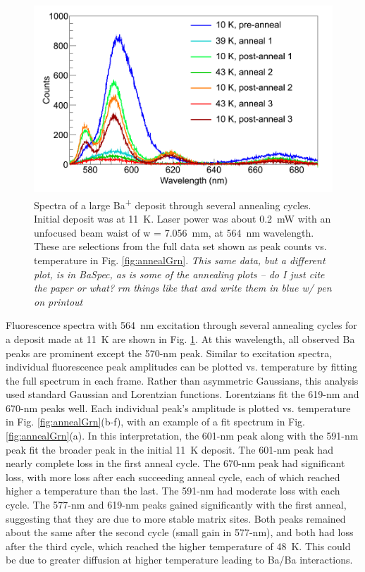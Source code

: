 \begin{figure} %
        \centering
                \includegraphics[width=.8\textwidth]{figures/spectra_annealing.png}
                \caption{Spectra of a large Ba\textsuperscript{+} deposit through several annealing cycles.  Initial deposit was at 11~K.  Laser power was about 0.2~mW with an unfocused beam waist of w = 7.056~mm, at 564~nm wavelength.  These are selections from the full data set shown as peak counts vs. temperature in Fig. \ref{fig:annealGrn}.  \emph{\color{red}This same data, but a different plot, is in BaSpec, as is some of the annealing plots -- do I just cite the paper or what?} \emph{\color{blue}rm things like that and write them in blue w/ pen on printout}}
\label{fig:specAnneal}
\end{figure}

Fluorescence spectra with 564~nm excitation through several annealing cycles for a deposit made at 11~K are shown in Fig. \ref{fig:specAnneal}.  At this wavelength, all observed Ba peaks are prominent except the 570-nm peak.  Similar to excitation spectra, individual fluorescence peak amplitudes can be plotted vs. temperature by fitting the full spectrum in each frame.  Rather than asymmetric Gaussians, this analysis used standard Gaussian and Lorentzian functions.  Lorentzians fit the 619-nm and 670-nm peaks well.  Each individual peak's amplitude is plotted vs. temperature in Fig. \ref{fig:annealGrn}(b-f), with an example of a fit spectrum in Fig. \ref{fig:annealGrn}(a).  In this interpretation, the 601-nm peak along with the 591-nm peak fit the broader peak in the initial 11~K deposit.  The 601-nm peak had nearly complete loss in the first anneal cycle.  The 670-nm peak had significant loss, with more loss after each succeeding anneal cycle, each of which reached higher a temperature than the last.  The 591-nm had moderate loss with each cycle.  The 577-nm and 619-nm peaks gained significantly with the first anneal, suggesting that they are due to more stable matrix sites.  Both peaks remained about the same after the second cycle (small gain in 577-nm), and both had loss after the third cycle, which reached the higher temperature of 48~K. This could be due to greater diffusion at higher temperature leading to Ba/Ba interactions.


